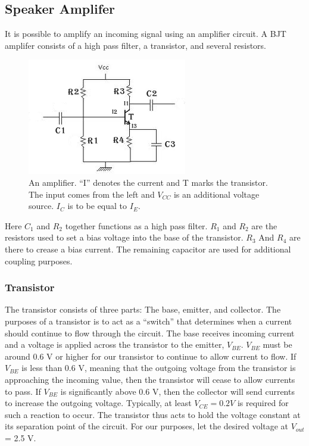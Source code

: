 \documentclass[12pt]{article}
\begin{document}
\subsection{Speaker Amplifer}
It is possible to amplify an incoming signal using an amplifier
circuit. A BJT amplifer consists of a high pass filter, a transistor,
and several resistors.
\begin{figure}[H]
\centering
\includegraphics[width=.75\textwidth]{amplifier.png}
\caption{An amplifier. ``I'' denotes the current and T marks the
  transistor. The input comes from the left and $V_{CC}$ is an
  additional voltage source. $I_{C}$ is to be equal to $I_{E}$.}
\end{figure}
Here $C_{1}$ and $R_{2}$ together functions as a high pass
filter. $R_{1}$ and $R_{2}$ are the resistors used to set a bias voltage
into the base of the transistor. $R_{3}$ And $R_{4}$ are there to crease
a bias current. The remaining capacitor are used for additional coupling
purposes.

\subsubsection{Transistor}
The transistor consists of three parts: The base, emitter, and
collector. The purposes of a transistor is to act as a ``switch'' that
determines when a current should continue to flow through the circuit. 
The base receives incoming current and a voltage is applied
across the transistor to the emitter, $V_{BE}$. $V_{BE}$ must be around
0.6 V or higher for our transistor to continue to allow current to
flow. If $V_{BE}$ is less than 0.6 V, meaning that the outgoing voltage
from the transistor is approaching the incoming value, then the
transistor will cease to allow currents to pass. If $V_{BE}$ is
significantly above 0.6 V, then the collector will send currents to
increase the outgoing voltage. Typically, at least $V_{CE} = 0.2 V$ is
required for such a reaction to occur. The transistor thus acts to hold
the voltage constant at its separation point of the circuit. For our
purposes, let the desired voltage at $V_{out}$ = 2.5 V.
\end{document}
